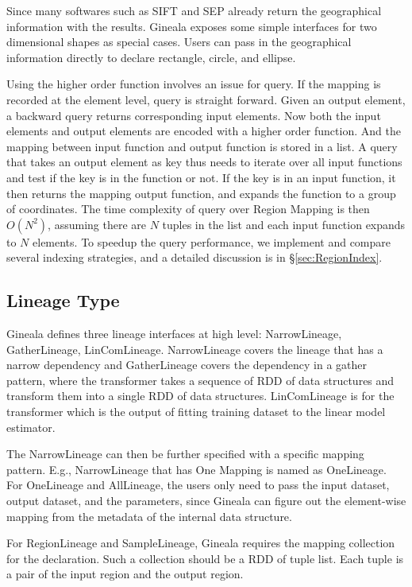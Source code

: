 \documentclass{sig-alternate}
\begin{document}
Since many softwares such as SIFT and SEP already return the geographical information with the results.
Gineala exposes some simple interfaces for two dimensional shapes as special cases.
Users can pass in the geographical information directly to declare rectangle, circle, and ellipse.

Using the higher order function involves an issue for query. If the mapping is recorded at the element level, query is straight forward.
Given an output element, a backward query returns corresponding input elements.
Now both the input elements and output elements are encoded with a higher order function. 
And the mapping between input function and output function is stored in a list. 
A query that takes an output element as key thus needs to iterate over all input functions and test if the key is in the function or not.
If the key is in an input function, it then returns the mapping output function, and expands the function to a group of coordinates.
The time complexity of query over Region Mapping is then $O(N^2)$, assuming there are $N$ tuples in the list and each input function expands to $N$ elements.
To speedup the query performance, we implement and compare several indexing strategies, and a detailed discussion is in \S\ref{sec:RegionIndex}.

\subsection{Lineage Type}
Gineala defines three lineage interfaces at high level: NarrowLineage, GatherLineage, LinComLineage. 
NarrowLineage covers the lineage that has a narrow dependency and GatherLineage covers the dependency in a gather pattern, where the transformer takes a sequence of RDD of data structures and transform them into a single RDD of data structures. 
LinComLineage is for the transformer which is the output of fitting training dataset to the linear model estimator.

The NarrowLineage can then be further specified with a specific mapping pattern. E.g., NarrowLineage that has One Mapping is named as OneLineage.
For OneLineage and AllLineage, the users only need to pass the input dataset, output dataset, and the parameters, since Gineala can figure out the element-wise mapping from the metadata of the internal data structure.

For RegionLineage and SampleLineage, Gineala requires the mapping collection for the declaration. 
Such a collection should be a RDD of tuple list. 
Each tuple is a pair of the input region and the output region.
\end{document}
